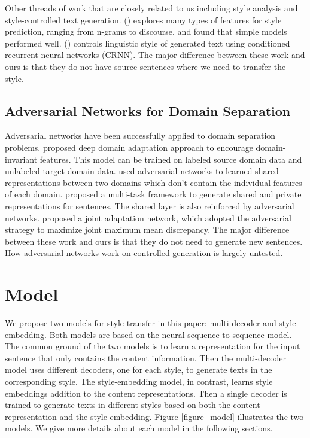 \documentclass[letterpaper]{article} \usepackage{aaai18}  \usepackage{times}  \usepackage{helvet}  \usepackage{courier}  \usepackage{url}  \usepackage{graphicx}  \usepackage{amsmath}
\newcommand{\newcite}[1]{\citeauthor{#1} (\citeyear{#1})}
\begin{document}
Other threads of work that are closely related to us including style analysis and style-controlled text generation.
\newcite{braud2017writing} explores many types of features for style prediction, ranging from n-grams to discourse,  
and found that simple models performed well. 
\newcite{ficler2017controlling} controls linguistic style of generated text 
using conditioned recurrent neural networks (CRNN). The major difference between these work and ours is 
that they do not have source sentences where we need to transfer the style.



\subsection{Adversarial Networks for Domain Separation}
Adversarial networks have been successfully applied to domain separation problems. 
\cite{ganin2015unsupervised} proposed deep domain adaptation approach to encourage domain-invariant features.
This model can be trained on labeled source domain data and unlabeled target domain data. 
\cite{bousmalis2016domain} used  adversarial networks to learned shared representations 
between two domains which don't contain the individual features of each domain. 
\cite{chen2017adversarial} proposed a multi-task framework to generate shared and private representations for sentences.  
The shared layer is also reinforced by adversarial networks. 
\cite{long2016deep} proposed a joint adaptation network, which adopted the adversarial strategy 
to maximize
joint maximum mean discrepancy. 
The major difference between these work and ours is that they do not need to generate 
new sentences. How adversarial networks work on controlled generation is largely untested.



\section{Model}
We propose two models for style transfer in this paper: multi-decoder and style-embedding. 
Both models are based on the neural sequence to sequence model. 
The common ground  of the two models is to learn a representation for the input 
sentence that only contains the content information. 
Then the multi-decoder model uses different decoders, one for each style, 
to generate texts in the corresponding style. 
The style-embedding model, in contrast, learns style embeddings addition 
to the content representations. Then a single decoder is trained to generate 
texts in different styles based on both the content representation and the style embedding.
Figure \ref{figure_model} illustrates the two models. We give more details about each model in the following sections.
\end{document}
